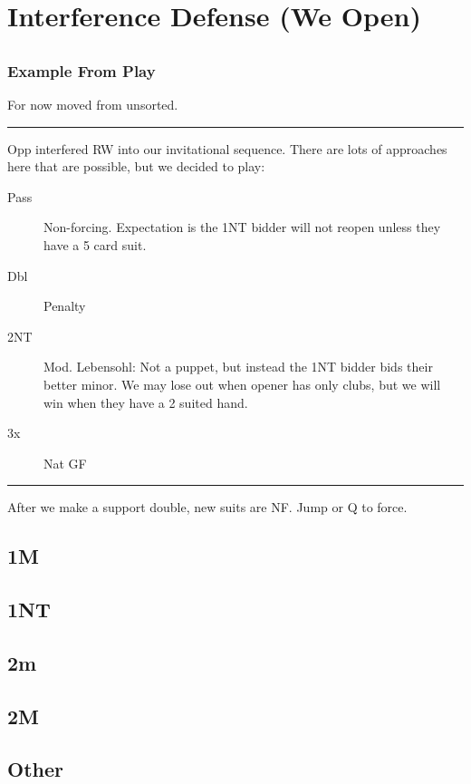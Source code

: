 \documentclass[tom-ari]{subfile}
\begin{document}
	
	\chapter{Interference Defense (We Open)}
	
	\section[1C]{}
	
	\section[1D]{}
	
	\subsection{Example From Play}
	
	For now moved from unsorted.
	
	\hrule
		
	
	Opp interfered RW into our invitational sequence. There are lots of approaches here that are possible, but we decided to play:
	\begin{description}
		\item[Pass] Non-forcing. Expectation is the 1NT bidder will not reopen unless they have a 5 card suit.
		\item[Dbl] Penalty
		\item[2NT] Mod. Lebensohl: Not a puppet, but instead the 1NT bidder bids their better minor. We may lose out when opener has only clubs, but we will win when they have a 2 suited hand.
		\item[3x] Nat GF
	\end{description}

	\hrule

After we make a support double, new suits are NF. Jump or Q to force.

	
	\section{1M}
	
	\section{1NT}
	
	\section{2m}
	
	\section{2M}
	
	\section{Other}
	
\end{document}
